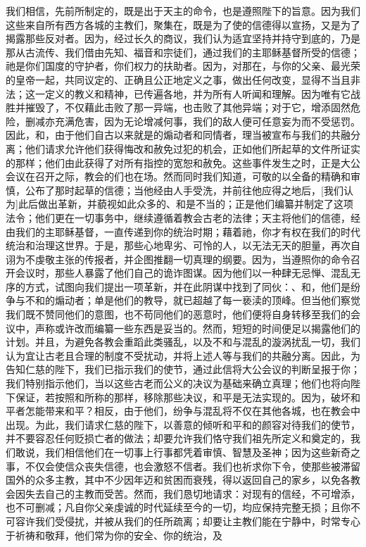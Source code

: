 我们相信，先前所制定的，既是出于天主的命令，也是遵照陛下的旨意。因为我们这些来自所有西方各城的主教们，聚集在，既是为了使的信德得以宣扬，又是为了揭露那些反对者。因为，经过长久的商议，我们认为适宜坚持并持守到底的，乃是那从古流传、我们借由先知、福音和宗徒们，通过我们的主耶稣基督所受的信德；祂是你们国度的守护者，你们权力的扶助者。因为，对那在，与你的父亲、最光荣的皇帝一起，共同议定的、正确且公正地定义之事，做出任何改变，显得不当且非法；这一定义的教义和精神，已传遍各地，并为所有人听闻和理解。因为唯有它战胜并摧毁了，不仅藉此击败了那一异端，也击败了其他异端；对于它，增添固然危险，删减亦充满危害，因为无论增减何事，我们的敌人便可任意妄为而不受惩罚。因此，和，由于他们自古以来就是的煽动者和同情者，理当被宣布与我们的共融分离；他们请求允许他们获得悔改和赦免过犯的机会，正如他们所起草的文件所证实的那样；他们由此获得了对所有指控的宽恕和赦免。这些事件发生之时，正是大公会议在召开之际，教会的们也在场。然而同时我们知道，可敬的以全备的精确和审慎，公布了那时起草的信德；当他经由人手受洗，并前往他应得之地后，[我们认为]此后做出革新，并藐视如此众多的、和是不当的；正是他们编纂并制定了这项法令；他们更在一切事务中，继续遵循着教会古老的法律；天主将他们的信德，经由我们的主耶稣基督，一直传递到你的统治时期；藉着祂，你才有权在我们的时代统治和治理这世界。于是，那些心地卑劣、可怜的人，以无法无天的胆量，再次自诩为不虔敬主张的传报者，并企图推翻一切真理的纲要。因为，当遵照你的命令召开会议时，那些人暴露了他们自己的诡诈图谋。因为他们以一种肆无忌惮、混乱无序的方式，试图向我们提出一项革新，并在此阴谋中找到了同伙：、和，他们是纷争与不和的煽动者；单是他们的教导，就已超越了每一亵渎的顶峰。但当他们察觉我们既不赞同他们的意图，也不苟同他们的恶意时，他们便将自身转移至我们的会议中，声称或许改而编纂一些东西是妥当的。然而，短短的时间便足以揭露他们的计划。并且，为避免各教会重蹈此类骚乱，以及不和与混乱的漩涡扰乱一切，我们认为宜让古老且合理的制度不受扰动，并将上述人等与我们的共融分离。因此，为告知仁慈的陛下，我们已指示我们的使节，通过此信将大公会议的判断呈报于你；我们特别指示他们，当以这些古老而公义的决议为基础来确立真理；他们也将向陛下保证，若按照和所称的那样，移除那些决议，和平是无法实现的。因为，破坏和平者怎能带来和平？相反，由于他们，纷争与混乱将不仅在其他各城，也在教会中出现。为此，我们请求仁慈的陛下，以善意的倾听和平和的颜容对待我们的使节，并不要容忍任何贬损亡者的做法；却要允许我们恪守我们祖先所定义和奠定的，我们敢说，我们相信他们在一切事上行事都凭着审慎、智慧及圣神；因为这些新奇之事，不仅会使信众丧失信德，也会激怒不信者。我们也祈求你下令，使那些被滞留国外的众多主教，其中不少因年迈和贫困而衰残，得以返回自己的家乡，以免各教会因失去自己的主教而受苦。然而，我们恳切地请求：对现有的信经，不可增添，也不可删减；凡自你父亲虔诚的时代延续至今的一切，均应保持完整无损；且你不可容许我们受侵扰，并被从我们的任所疏离；却要让主教们能在宁静中，时常专心于祈祷和敬拜，他们常为你的安全、你的统治，及